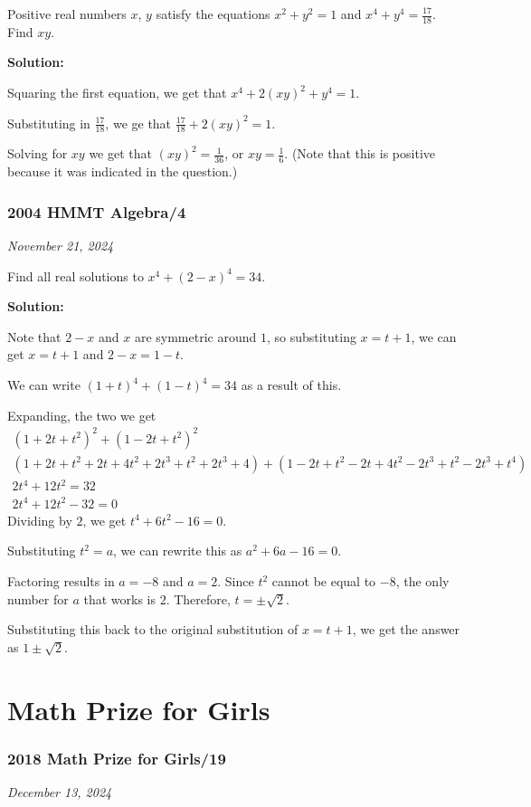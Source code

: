 \documentclass[../mathproblems.tex]{subfiles}
\begin{document}
Positive real numbers $ x$, $ y$ satisfy the equations $ x^2 + y^2 = 1$ and $ x^4 + y^4 = \frac {17}{18}$. Find $ xy$.

\textbf{Solution:}

Squaring the first equation, we get that $x^4+2(xy)^2+y^4=1$. 

Substituting in $\frac{17}{18}$, we ge that $\frac{17}{18}+2(xy)^2 = 1$.

Solving for $xy$ we get that $(xy)^2 = \frac{1}{36}$, or $xy = \boxed{\frac{1}{6}}$. (Note that this is positive because it was indicated in the question.)

\noindent\hrulefill



\subsubsection*{2004 HMMT Algebra/4} 
\textit{November 21, 2024}

Find all real solutions to $x^4+(2-x)^4=34$.

\textbf{Solution:}

Note that $2-x$ and $x$ are symmetric around $1$, so substituting $x=t+1$, we can get $x=t+1$ and $2-x=1-t$.

We can write $(1+t)^4+(1-t)^4=34$ as a result of this.

Expanding, the two we get
\begin{align*} (1+2t+t^2)^2+(1-2t+t^2)^2\\ (1+2t+t^2+2t+4t^2+2t^3+t^2+2t^3+4)+(1-2t+t^2-2t+4t^2-2t^3+t^2-2t^3+t^4)\\ 2t^4+12t^2=32\\ 2t^4+12t^2-32=0 \end{align*}
Dividing by $2$, we get $t^4+6t^2-16=0$.

Substituting $t^2=a$, we can rewrite this as $a^2+6a-16=0$.

Factoring results in $a=-8$ and $a=2$. Since $t^2$ cannot be equal to $-8$, the only number for $a$ that works is $2$. Therefore, $t=\pm\sqrt{2}$.

Substituting this back to the original substitution of $x=t+1$, we get the answer as $\boxed{1\pm\sqrt{2}}$.

\noindent\hrulefill

\section{Math Prize for Girls}
\subsubsection*{2018 Math Prize for Girls/19}
\textit{December 13, 2024}
\end{document}

